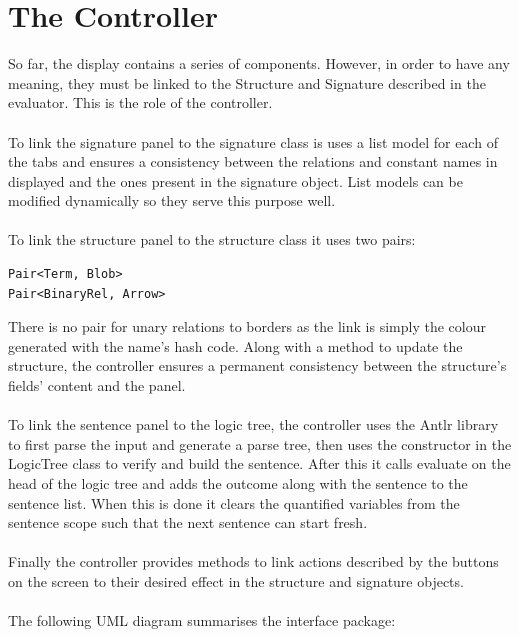 \documentclass{report}
\begin{document}
\section{The Controller}
So far, the display contains a series of components. However, in order to have 
any meaning, they must be linked to the Structure and Signature described in the 
evaluator. This is the role of the controller.
\\ \\
To link the signature panel to the signature class is uses a list model for each 
of the tabs and ensures a consistency between the relations and constant names 
in displayed and the ones present in the signature object. List models can be 
modified dynamically so they serve this purpose well.
\\ \\
To link the structure panel to the structure class it uses two pairs:
\begin{verbatim}
Pair<Term, Blob>
Pair<BinaryRel, Arrow>
\end{verbatim}
There is no pair for unary relations to borders as the link is simply the colour 
generated with the name's hash code. Along with a method to update the 
structure, the controller ensures a permanent consistency between the 
structure's fields' content and the panel.
\\ \\
To link the sentence panel to the logic tree, the controller uses the Antlr 
library to first parse the input and generate a parse tree, then uses the 
constructor in the LogicTree class to verify and build the sentence. After this 
it calls evaluate on the head of the logic tree and adds the outcome along with 
the sentence to the sentence list. When this is done it clears the quantified 
variables from the sentence scope such that the next sentence can start fresh.
\\ \\
Finally the controller provides methods to link actions described by the buttons 
on the screen to their desired effect in the structure and signature objects.
\\ \\
The following UML diagram\cite{uml} summarises the interface package: \\
\end{document}

